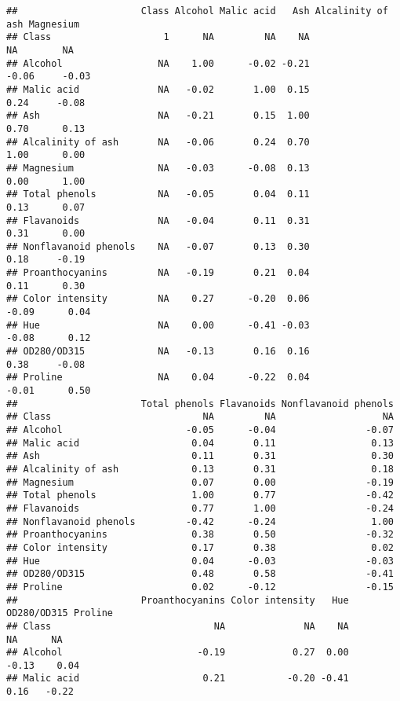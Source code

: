 \documentclass[
]{article}
\begin{document}
\begin{verbatim}
##                      Class Alcohol Malic acid   Ash Alcalinity of ash Magnesium
## Class                    1      NA         NA    NA                NA        NA
## Alcohol                 NA    1.00      -0.02 -0.21             -0.06     -0.03
## Malic acid              NA   -0.02       1.00  0.15              0.24     -0.08
## Ash                     NA   -0.21       0.15  1.00              0.70      0.13
## Alcalinity of ash       NA   -0.06       0.24  0.70              1.00      0.00
## Magnesium               NA   -0.03      -0.08  0.13              0.00      1.00
## Total phenols           NA   -0.05       0.04  0.11              0.13      0.07
## Flavanoids              NA   -0.04       0.11  0.31              0.31      0.00
## Nonflavanoid phenols    NA   -0.07       0.13  0.30              0.18     -0.19
## Proanthocyanins         NA   -0.19       0.21  0.04              0.11      0.30
## Color intensity         NA    0.27      -0.20  0.06             -0.09      0.04
## Hue                     NA    0.00      -0.41 -0.03             -0.08      0.12
## OD280/OD315             NA   -0.13       0.16  0.16              0.38     -0.08
## Proline                 NA    0.04      -0.22  0.04             -0.01      0.50
##                      Total phenols Flavanoids Nonflavanoid phenols
## Class                           NA         NA                   NA
## Alcohol                      -0.05      -0.04                -0.07
## Malic acid                    0.04       0.11                 0.13
## Ash                           0.11       0.31                 0.30
## Alcalinity of ash             0.13       0.31                 0.18
## Magnesium                     0.07       0.00                -0.19
## Total phenols                 1.00       0.77                -0.42
## Flavanoids                    0.77       1.00                -0.24
## Nonflavanoid phenols         -0.42      -0.24                 1.00
## Proanthocyanins               0.38       0.50                -0.32
## Color intensity               0.17       0.38                 0.02
## Hue                           0.04      -0.03                -0.03
## OD280/OD315                   0.48       0.58                -0.41
## Proline                       0.02      -0.12                -0.15
##                      Proanthocyanins Color intensity   Hue OD280/OD315 Proline
## Class                             NA              NA    NA          NA      NA
## Alcohol                        -0.19            0.27  0.00       -0.13    0.04
## Malic acid                      0.21           -0.20 -0.41        0.16   -0.22

\end{verbatim}
\end{document}
